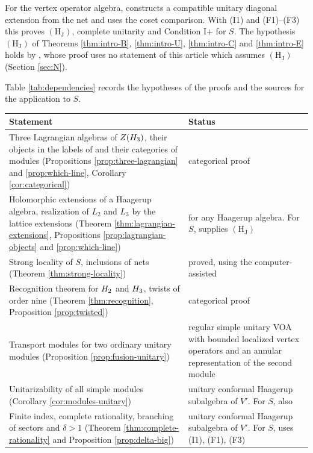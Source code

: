 \documentclass[leqno]{article}
\let\cal\relax
\newcommand{\cal}{\mathcal}
\numberwithin{equation}{section}
\begin{document}
For the vertex operator algebra, \cite[Theorems 4.25, 5.1 and 6.1]{ArhIII} constructs a compatible unitary diagonal extension from the net and uses the coset comparison. With \textup{(I1)} and \textup{(F1)}--\textup{(F3)} this proves $\mathrm{(H_J)}$, complete unitarity and Condition I+ for $S$. The hypothesis $\mathrm{(H_J)}$ of Theorems \ref{thm:intro-B}, \ref{thm:intro-U}, \ref{thm:intro-C} and \ref{thm:intro-E} holds by \cite[Theorem 6.1]{ArhIII}, whose proof uses no statement of this article which assumes $\mathrm{(H_J)}$ (Section \ref{sec:N}).

Table \ref{tab:dependencies} records the hypotheses of the proofs and the sources for the application to $S$.

\begin{table}[!htbp]
\centering
\small
\begin{tabular}{>{\raggedright\arraybackslash}p{7.9cm}>{\raggedright\arraybackslash}p{5.6cm}}
\hline
Statement & Status \\
\hline
Three Lagrangian algebras of $Z(\cal H_3)$, their objects in the labels of \cite{EvG11} and their categories of modules (Propositions \ref{prop:three-lagrangian} and \ref{prop:which-line}, Corollary \ref{cor:categorical}) & categorical proof \\
Holomorphic extensions of a Haagerup algebra, realization of $L_2$ and $L_3$ by the lattice extensions (Theorem \ref{thm:lagrangian-extensions}, Propositions \ref{prop:lagrangian-objects} and \ref{prop:which-line}) & for any Haagerup algebra. For $S$, \cite[Theorem 6.1]{ArhIII} supplies $\mathrm{(H_J)}$ \\
Strong locality of $S$, inclusions of nets (Theorem \ref{thm:strong-locality}) & proved, using the computer-assisted \cite[Theorem 10.10]{Arh26} \\
Recognition theorem for $\cal H_2$ and $\cal H_3$, twists of order nine (Theorem \ref{thm:recognition}, Proposition \ref{prop:twisted}) & categorical proof \\
Transport modules for two ordinary unitary modules (Proposition \ref{prop:fusion-unitary}) & regular simple unitary VOA with bounded localized vertex operators and an annular representation of the second module \\
Unitarizability of all simple modules (Corollary \ref{cor:modules-unitary}) & unitary conformal Haagerup subalgebra of $V'$. For $S$, also \cite[Theorem 6.1]{ArhIII} \\
Finite index, complete rationality, branching of sectors and $\delta>1$ (Theorem \ref{thm:complete-rationality} and Proposition \ref{prop:delta-big}) & unitary conformal Haagerup subalgebra of $V'$. For $S$, \cite[Theorem 3.1(1)--(2)]{ArhIII} uses \textup{(I1)}, \textup{(F1)}, \textup{(F3)} \\

\end{tabular}
\end{table}
\end{document}
